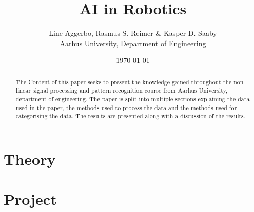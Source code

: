 

\title{
	\textbf{AI in Robotics}
}

\author{
	Line Aggerbo, Rasmus S. Reimer \& Kasper D. Saaby\\
	Aarhus University, Department of Engineering \\
}
\date{\today}




\maketitle

\tableofcontents


\begin{abstract}
The Content of this paper seeks to present the knowledge gained throughout the non-linear signal processing and pattern recognition course from Aarhus University, department of engineering. The paper is split into multiple sections explaining the data used in the paper, the methods used to process the data and the methods used for categorising the data. The results are presented along with a discussion of the results.
\end{abstract}


\chapter{Theory}








\chapter{Project}











